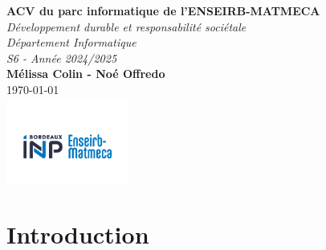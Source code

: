 \documentclass[12pt,a4paper]{article}
\newcommand{\Title}{ACV du parc informatique de l’ENSEIRB-MATMECA}
\newcommand{\Course}{Développement durable et responsabilité sociétale
\\ Département Informatique
\\ S6 - Année 2024/2025}
\newcommand{\Author}{Mélissa Colin - Noé Offredo}
\newcommand{\Date}{\today}
\begin{document}
\begin{titlepage}
    \centering
    \vspace*{3cm}
    {\Huge \textbf{\Title}}\\[1.5cm]
    {\Large \textit{\Course}}\\[2cm]
    \textbf{\Author}\\[1cm]
    \Date\\
    \vfill
    \includegraphics[width=0.3\textwidth]{logo.png}
    \vspace*{1cm}
\end{titlepage}

\tableofcontents
\newpage

\section{Introduction}
\end{document}
